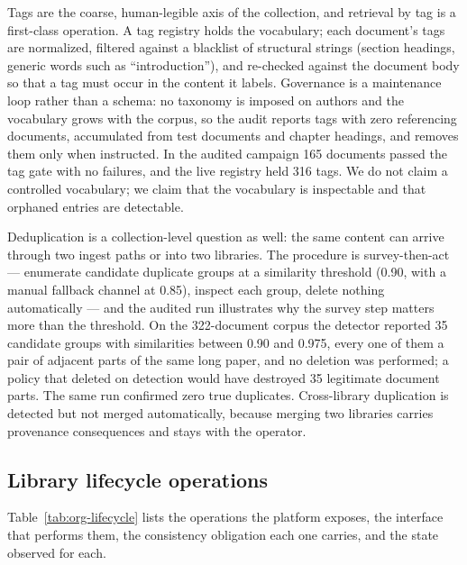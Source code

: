 Tags are the coarse, human-legible axis of the collection, and retrieval by
tag is a first-class operation. A tag registry holds the vocabulary; each
document's tags are normalized, filtered against a blacklist of structural
strings (section headings, generic words such as ``introduction''), and
re-checked against the document body so that a tag must occur in the content
it labels. Governance is a maintenance loop rather than a schema: no taxonomy
is imposed on authors and the vocabulary grows with the corpus, so the audit
reports tags with zero referencing documents, accumulated from test documents
and chapter headings, and removes them only when instructed. In the audited
campaign 165 documents passed the tag gate with no failures, and the live
registry held 316 tags. We do not claim a controlled vocabulary; we claim
that the vocabulary is inspectable and that orphaned entries are detectable.

Deduplication is a collection-level question as well: the same content can
arrive through two ingest paths or into two libraries. The procedure is
survey-then-act --- enumerate candidate duplicate groups at a similarity
threshold (0.90, with a manual fallback channel at 0.85), inspect each group,
delete nothing automatically --- and the audited run illustrates why the
survey step matters more than the threshold. On the 322-document corpus the
detector reported 35 candidate groups with similarities between 0.90 and
0.975, every one of them a pair of adjacent parts of the same long paper, and
no deletion was performed; a policy that deleted on detection would have
destroyed 35 legitimate document parts. The same run confirmed zero true
duplicates. Cross-library duplication is detected but not merged
automatically, because merging two libraries carries provenance consequences
and stays with the operator.

\subsection{Library lifecycle operations}
\label{sec:org-lifecycle}

Table~\ref{tab:org-lifecycle} lists the operations the platform exposes, the
interface that performs them, the consistency obligation each one carries,
and the state observed for each.

